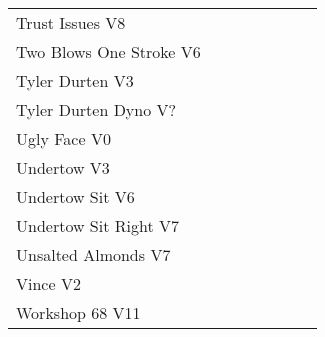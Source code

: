 \begin{center}
\begin{supertabular}{p{0.65\linewidth}r}
Trust Issues V8 & \pageref{rt:Trust Issues} \\
Two Blows One Stroke V6 & \pageref{rt:Two Blows One Stroke} \\
Tyler Durten V3 & \pageref{rt:Tyler Durten} \\
Tyler Durten Dyno V? & \pageref{vr:Tyler Durten Dyno} \\
Ugly Face V0 & \pageref{rt:Ugly Face} \\
Undertow V3 & \pageref{rt:Undertow} \\
Undertow Sit V6 & \pageref{vr:Undertow Sit} \\
Undertow Sit Right V7 & \pageref{vr:Undertow Sit Right} \\
Unsalted Almonds V7 & \pageref{rt:Unsalted Almonds} \\
Vince V2 & \pageref{rt:Vince} \\
Workshop 68 V11 & \pageref{rt:Workshop 68} \\
\end{supertabular}
\end{center}
